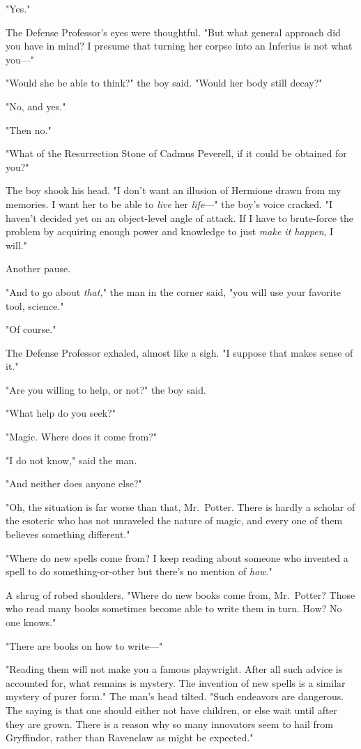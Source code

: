 "Yes."

The Defense Professor's eyes were thoughtful. "But what general approach did
you have in mind? I presume that turning her corpse into an Inferius is not
what you\mbox{---}"

"Would she be able to think?" the boy said. "Would her body still decay?"

"No, and yes."

"Then no."

"What of the Resurrection Stone of Cadmus Peverell, if it could be obtained for
you?"

The boy shook his head. "I don't want an illusion of Hermione drawn from my
memories. I want her to be able to \emph{live} her \emph{life}\mbox{---}" the boy's
voice cracked. "I haven't decided yet on an object-level angle of attack. If I
have to brute-force the problem by acquiring enough power and knowledge to just
\emph{make it happen}, I will."

Another pause.

"And to go about \emph{that,}" the man in the corner said, "you will use your
favorite tool, science."

"Of course."

The Defense Professor exhaled, almost like a sigh. "I suppose that makes sense
of it."

"Are you willing to help, or not?" the boy said.

"What help do you seek?"

"Magic. Where does it come from?"

"I do not know," said the man.

"And neither does anyone else?"

"Oh, the situation is far worse than that, Mr.~Potter. There is hardly a
scholar of the esoteric who has not unraveled the nature of magic, and every
one of them believes something different."

"Where do new spells come from? I keep reading about someone who invented a
spell to do something-or-other but there's no mention of \emph{how}."

A shrug of robed shoulders. "Where do new books come from, Mr.~Potter? Those
who read many books sometimes become able to write them in turn. How? No one
knows."

"There are books on how to write\mbox{---}"

"Reading them will not make you a famous playwright. After all such advice is
accounted for, what remains is mystery. The invention of new spells is a
similar mystery of purer form." The man's head tilted. "Such endeavors are
dangerous. The saying is that one should either not have children, or else wait
until after they are grown. There is a reason why so many innovators seem to
hail from Gryffindor, rather than Ravenclaw as might be expected."

